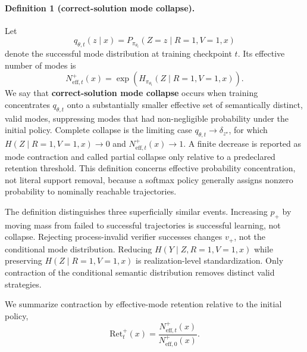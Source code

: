 \documentclass[letterpaper]{article} %
\begin{document}
\paragraph{Definition 1 (correct-solution mode collapse).}
Let
\[
q_{\theta,t}(z\mid x)=P_{\pi_{\theta_t}}(Z=z\mid R=1,V=1,x)
\]
denote the successful mode distribution at training checkpoint \(t\). Its effective number of modes is
\begin{equation}
N^+_{\mathrm{eff},t}(x)
=\exp\!\left(H_{\pi_{\theta_t}}(Z\mid R=1,V=1,x)\right).
\label{eq:effective-modes}
\end{equation}
We say that \textbf{correct-solution mode collapse} occurs when training concentrates \(q_{\theta,t}\) onto a substantially smaller effective set of semantically distinct, valid modes, suppressing modes that had non-negligible probability under the initial policy. Complete collapse is the limiting case \(q_{\theta,t}\to\delta_{z^\star}\), for which \(H(Z\mid R=1,V=1,x)\to0\) and \(N^+_{\mathrm{eff},t}(x)\to1\). A finite decrease is reported as mode contraction and called partial collapse only relative to a predeclared retention threshold. This definition concerns effective probability concentration, not literal support removal, because a softmax policy generally assigns nonzero probability to nominally reachable trajectories.

The definition distinguishes three superficially similar events. Increasing \(p_+\) by moving mass from failed to successful trajectories is successful learning, not collapse. Rejecting process-invalid verifier successes changes \(v_+\), not the conditional mode distribution. Reducing \(H(Y\mid Z,R=1,V=1,x)\) while preserving \(H(Z\mid R=1,V=1,x)\) is realization-level standardization. Only contraction of the conditional semantic distribution removes distinct valid strategies.

We summarize contraction by effective-mode retention relative to the initial policy,
\begin{equation}
\mathrm{Ret}^+_t(x)
=\frac{N^+_{\mathrm{eff},t}(x)}
       {N^+_{\mathrm{eff},0}(x)}.
\label{eq:mode-retention}
\end{equation}
\end{document}
